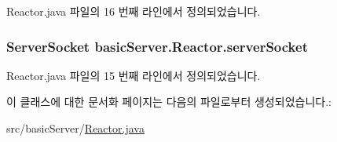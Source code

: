 Reactor.\+java 파일의 16 번째 라인에서 정의되었습니다.

\hypertarget{classbasic_server_1_1_reactor_a2ddae2bb37e01fa74cfdd54b02ad00d0}{
\subsubsection[{server\+Socket}]{\setlength{\rightskip}{0pt plus 5cm}Server\+Socket basic\+Server.\+Reactor.\+server\+Socket\hspace{0.3cm}{\ttfamily [private]}}}\label{classbasic_server_1_1_reactor_a2ddae2bb37e01fa74cfdd54b02ad00d0}


Reactor.\+java 파일의 15 번째 라인에서 정의되었습니다.



이 클래스에 대한 문서화 페이지는 다음의 파일로부터 생성되었습니다.\+:\begin{DoxyCompactItemize}
\item 
src/basic\+Server/\hyperlink{_reactor_8java}{Reactor.\+java}\end{DoxyCompactItemize}
